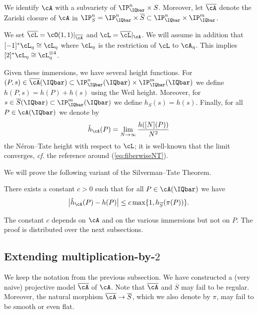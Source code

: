 We identify $\cA$ with a subvariety of $\IP_\IQbar^n\times S$.
Moreover, let $\overline{\cA}$ denote the Zariski closure of
$\cA$ in $\IP_S^n=\IP_{\IQbar}^n\times\overline S \subset
\IP_{\IQbar}^n\times\IP_\IQbar^m$. %

We set $\overline\cL = \cO(1,1)|_{\overline{\cA}}$ and  $\cL
= \overline\cL|_{\cA}$. We  will  assume in addition that
$[-1]^*\cL_\eta \cong \cL_\eta$
where  $\cL_\eta$ is the restriction of $\cL$ to $\cA_\eta$.
This implies
$[2]^*\cL_\eta \cong \cL_\eta^{\otimes 4}$.

\newcommand{\hcA}{h}

Given these immersions, we have several height functions.
For
$(P,s)\in \overline{\cA}(\IQbar)\subset \IP^n_\IQbar(\IQbar)\times \IP^m_\IQbar(\IQbar)$ we define
$\hcA(P,s) = h(P)+h(s)$ using the Weil height.
Moreover, for $s\in \overline S(\IQbar)\subset \IP^m_\IQbar(\IQbar)$
we define $h_{\overline S}(s) = h(s)$.
Finally,
for all  $P\in \cA(\IQbar)$ we denote by
  \begin{equation*}
    \hat h_{\cA}(P) = \lim_{N\rightarrow \infty}
    \frac{\hcA([N](P))}{N^2}
  \end{equation*}
the N\'eron--Tate height with respect to $\cL$;  it is
well-known that the limit converges, \textit{cf.} the reference around
(\ref{eq:fiberwiseNT}).

We will prove the following variant of the Silverman--Tate Theorem.

\begin{theorem}
\notready
  \label{thm:silvermantate}
  There exists a constant $c>0$  such that for all
  $P \in \cA(\IQbar)$ we have
  \begin{equation*}
    \bigl| \hat h_{\cA}(P) -
    \hcA(P)\bigr| \le c  \max\{1,h_{\overline
      S}(\pi(P))\}.
  \end{equation*}
\end{theorem}

The constant $c$ depends on $\cA$ and on the various immersions but not on $P$.
The proof is distributed over  the  next subsections.

\subsection{Extending multiplication-by-$2$}
We keep the notation from the  previous subsection.
We have  constructed a (very naive) projective model $\overline\cA$ of $\cA$.
Note that $\overline\cA$ and $\overline S$ may fail to be regular.
Moreover, the natural morphism
$\overline\cA\rightarrow \overline S$, which we also denote by $\pi$,  may fail to be smooth or even
flat.

